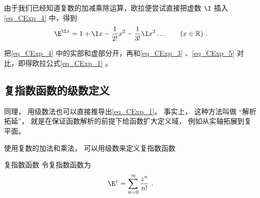 由于我们已经知道复数的加减乘除运算，欧拉便尝试直接把虚数 $\I$ 插入\autoref{eq_CExp_4}  中，得到
\begin{equation}\label{eq_CExp_4}
\E^{\I x} =1 + \I x - \frac{1}{2!} x^2 - \frac{1}{3!} \I x^3  \ldots
\qquad (x \in \mathbb R)~.
\end{equation}

把\autoref{eq_CExp_4} 中的实部和虚部分开，再和\autoref{eq_CExp_3} 、\autoref{eq_CExp_5} 对比，即得欧拉公式\autoref{eq_CExp_1} 。

\subsection{复指数函数的级数定义}
同理， 用级数法也可以直接推导出\autoref{eq_CExp_1}。 事实上， 这种方法叫做 “解析拓延”， 就是在保证函数解析的前提下给函数扩大定义域， 例如从实轴拓展到复平面。

使用复数的加法和乘法， 可以用级数来定义复指数函数
\begin{definition}{复指数函数}
令复指数函数为
\begin{equation}
\E^z = \sum_{n=0}^\infty \frac{z^n}{n!}~.
\end{equation}
\end{definition}
